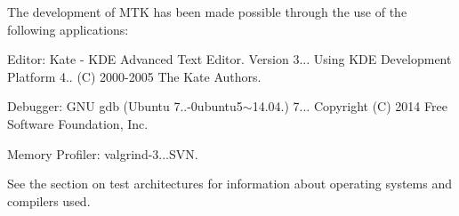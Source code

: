 The development of M\+T\+K has been made possible through the use of the following applications\+:
\begin{DoxyEnumerate}
\item Editor\+: Kate -\/ K\+D\+E Advanced Text Editor. Version 3... Using K\+D\+E Development Platform 4.. (C) 2000-\/2005 The Kate Authors.
\item Debugger\+: G\+N\+U gdb (Ubuntu 7..-\/0ubuntu5$\sim$14.04.) 7... Copyright (C) 2014 Free Software Foundation, Inc.
\item Memory Profiler\+: valgrind-\/3...\+S\+V\+N.
\end{DoxyEnumerate}

See the section on test architectures for information about operating systems and compilers used. 